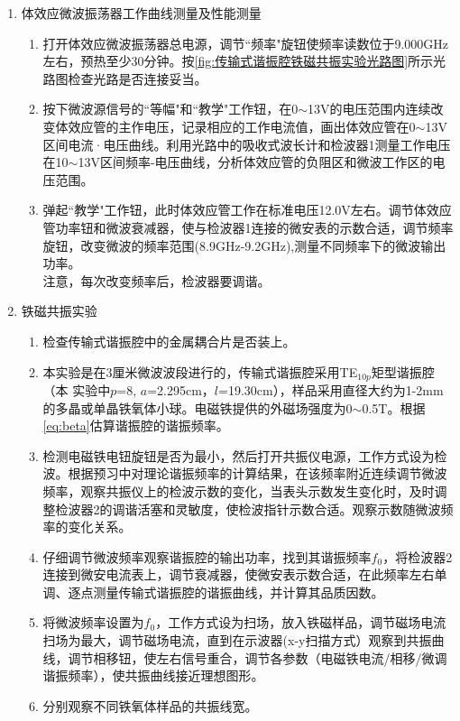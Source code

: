 \begin{enumerate}
	\item 体效应微波振荡器工作曲线测量及性能测量
		\begin{enumerate}
			\item 打开体效应微波振荡器总电源，调节“频率"旋钮使频率读数位于9.000GHz 左右，预热至少30分钟。按\cref{fig:传输式谐振腔铁磁共振实验光路图}所示光路图检查光路是否连接妥当。
			\item 按下微波源信号的“等幅"和“教学"工作钮，在0$\sim$13V的电压范围内连续改变体效应管的主作电压，记录相应的工作电流值，画出体效应管在0$\sim$13V区间电流·电压曲线。利用光路中的吸收式波长计和检波器1测量工作电压在10$\sim$13V区间频率-电压曲线，分析体效应管的负阻区和微波工作区的电压范围。
			\item 弹起“教学"工作钮，此时体效应管工作在标准电压12.0V左右。调节体效应管功率钮和微波衰减器，使与检波器1连接的微安表的示数合适，调节频率旋钮，改变微波的频率范围(8.9GHz-9.2GHz),测量不同频率下的微波输出功率。\\
			注意，每次改变频率后，检波器要调谐。
		\end{enumerate}
	\item 铁磁共振实验
		\begin{enumerate}
			\item 检查传输式谐振腔中的金属耦合片是否装上。
			\item 本实验是在3厘米微波波段进行的，传输式谐振腔采用TE$_{10p}$矩型谐振腔（本 实验中$p$=8, $a$=2.295cm，$l$=19.30cm），样品采用直径大约为1-2mm的多晶或单晶铁氧体小球。电磁铁提供的外磁场强度为0$\sim$0.5T。根据\cref{eq:beta}估算谐振腔的谐振频率。
			\item 检测电磁铁电钮旋钮是否为最小，然后打开共振仪电源，工作方式设为检波。根据预习中对理论谐振频率的计算结果，在该频率附近连续调节微波频率，观察共振仪上的检波示数的变化，当表头示数发生变化时，及时调整检波器2的调谐活塞和灵敏度，使检波指针示数合适。观察示数随微波频率的变化关系。
			\item 仔细调节微波频率观察谐振腔的输出功率，找到其谐振频率$f_0$，将检波器2连接到微安电流表上，调节衰减器，使微安表示数合适，在此频率左右单调、逐点测量传输式谐振腔的谐振曲线，并计算其品质因数。
			\item 将微波频率设置为$f_0$，工作方式设为扫场，放入铁磁样品，调节磁场电流扫场为最大，调节磁场电流，直到在示波器(x-y扫描方式）观察到共振曲线，调节相移钮，使左右信号重合，调节各参数（电磁铁电流/相移/微调谐振频率），使共振曲线接近理想图形。
			\item 分别观察不同铁氧体样品的共振线宽。
			\begin{enumerate}

\end{enumerate}
\end{enumerate}
\end{enumerate}
